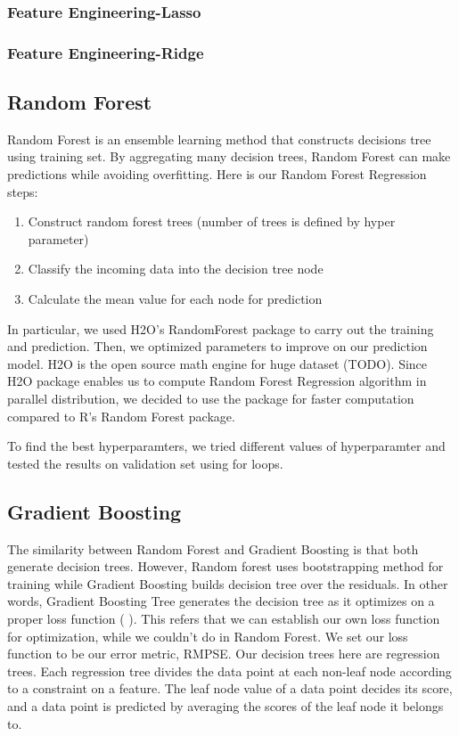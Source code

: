 \documentclass[letterpaper,twocolumn,10pt]{article}
\begin{document}
\subsubsection{Feature Engineering-Lasso}

\subsubsection{Feature Engineering-Ridge}


\subsection{Random Forest}
Random Forest is an ensemble learning method that constructs decisions tree using training set. By aggregating many decision trees, Random Forest can make predictions while avoiding overfitting. Here is our Random Forest Regression steps: \\
\begin{enumerate}
\item Construct random forest trees (number of trees is defined by hyper parameter)
\item Classify the incoming data into the decision tree node
\item Calculate the mean value for each node for prediction
\end{enumerate}

In particular, we used H2O’s RandomForest package to carry out the training and prediction. Then, we optimized parameters to improve on our prediction model. H2O is the open source math engine for huge dataset (TODO). Since H2O package enables us to compute Random Forest Regression algorithm in parallel distribution, we decided to use the package for faster computation compared to R's Random Forest package.

To find the best hyperparamters, we tried different values of hyperparamter and tested the results on validation set using for loops.

\subsection{Gradient Boosting}
The similarity between Random Forest and Gradient Boosting is that both generate decision trees. However, Random forest uses bootstrapping method for training while Gradient Boosting builds decision tree over the residuals. In other words, Gradient Boosting Tree generates the decision tree as it optimizes on a proper loss function (   ). This refers that we can establish our own loss function for optimization, while we couldn't do in Random Forest. We set our loss function to be our error metric, RMPSE. Our decision trees here are regression trees. Each regression tree divides the data point at each non-leaf node according to a constraint on a feature. The leaf node value of a data point decides its score, and a data point is predicted by averaging the scores of the leaf node it belongs to.
\end{document}
